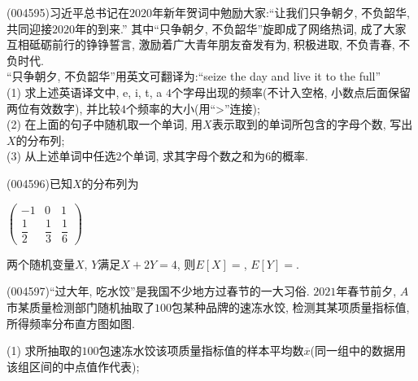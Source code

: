 \item (004595)习近平总书记在$2020$年新年贺词中勉励大家:``让我们只争朝夕, 不负韶华, 共同迎接$2020$年的到来.'' 其中``只争朝夕, 不负韶华''旋即成了网络热词, 成了大家互相砥砺前行的铮铮誓言, 激励着广大青年朋友奋发有为, 积极进取, 不负青春, 不负时代.\\
``只争朝夕, 不负韶华''用英文可翻译为:``seize the day and live it to the full''\\
(1) 求上述英语译文中, e, i, t, a $4$个字母出现的频率(不计入空格, 小数点后面保留两位有效数字), 并比较$4$个频率的大小(用``>''连接);\\
(2) 在上面的句子中随机取一个单词, 用$X$表示取到的单词所包含的字母个数, 写出$X$的分布列;\\
(3) 从上述单词中任选$2$个单词, 求其字母个数之和为$6$的概率.
\item (004596)已知$X$的分布列为
\begin{center}
    $\begin{pmatrix}
        -1 & 0 & 1 \\ 
        \dfrac 12 & \dfrac 13 & \dfrac 16 
    \end{pmatrix}$
\end{center}
两个随机变量$X$, $Y$满足$X+2Y=4$, 则$E[X]=$, $E[Y]=$.
\item (004597)``过大年, 吃水饺''是我国不少地方过春节的一大习俗. $2021$年春节前夕, $A$市某质量检测部门随机抽取了$100$包某种品牌的速冻水饺, 检测其某项质量指标值, 所得频率分布直方图如图.
\begin{center}
\end{center}
(1) 求所抽取的$100$包速冻水饺该项质量指标值的样本平均数$\overline x$(同一组中的数据用该组区间的中点值作代表);\\
